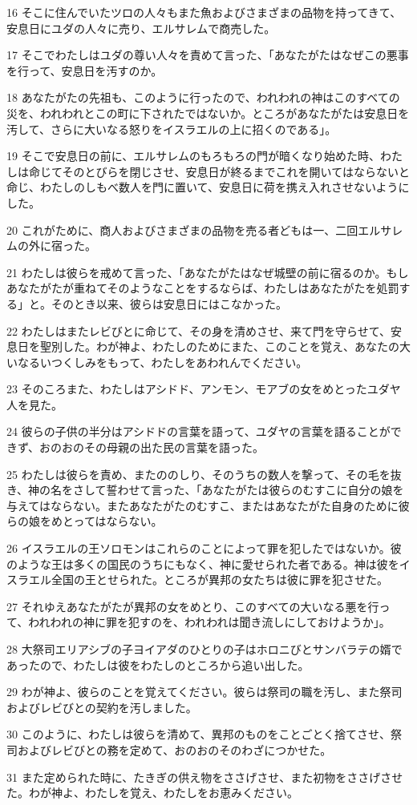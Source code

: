 \par 16 そこに住んでいたツロの人々もまた魚およびさまざまの品物を持ってきて、安息日にユダの人々に売り、エルサレムで商売した。
\par 17 そこでわたしはユダの尊い人々を責めて言った、「あなたがたはなぜこの悪事を行って、安息日を汚すのか。
\par 18 あなたがたの先祖も、このように行ったので、われわれの神はこのすべての災を、われわれとこの町に下されたではないか。ところがあなたがたは安息日を汚して、さらに大いなる怒りをイスラエルの上に招くのである」。
\par 19 そこで安息日の前に、エルサレムのもろもろの門が暗くなり始めた時、わたしは命じてそのとびらを閉じさせ、安息日が終るまでこれを開いてはならないと命じ、わたしのしもべ数人を門に置いて、安息日に荷を携え入れさせないようにした。
\par 20 これがために、商人およびさまざまの品物を売る者どもは一、二回エルサレムの外に宿った。
\par 21 わたしは彼らを戒めて言った、「あなたがたはなぜ城壁の前に宿るのか。もしあなたがたが重ねてそのようなことをするならば、わたしはあなたがたを処罰する」と。そのとき以来、彼らは安息日にはこなかった。
\par 22 わたしはまたレビびとに命じて、その身を清めさせ、来て門を守らせて、安息日を聖別した。わが神よ、わたしのためにまた、このことを覚え、あなたの大いなるいつくしみをもって、わたしをあわれんでください。
\par 23 そのころまた、わたしはアシドド、アンモン、モアブの女をめとったユダヤ人を見た。
\par 24 彼らの子供の半分はアシドドの言葉を語って、ユダヤの言葉を語ることができず、おのおのその母親の出た民の言葉を語った。
\par 25 わたしは彼らを責め、またののしり、そのうちの数人を撃って、その毛を抜き、神の名をさして誓わせて言った、「あなたがたは彼らのむすこに自分の娘を与えてはならない。またあなたがたのむすこ、またはあなたがた自身のために彼らの娘をめとってはならない。
\par 26 イスラエルの王ソロモンはこれらのことによって罪を犯したではないか。彼のような王は多くの国民のうちにもなく、神に愛せられた者である。神は彼をイスラエル全国の王とせられた。ところが異邦の女たちは彼に罪を犯させた。
\par 27 それゆえあなたがたが異邦の女をめとり、このすべての大いなる悪を行って、われわれの神に罪を犯すのを、われわれは聞き流しにしておけようか」。
\par 28 大祭司エリアシブの子ヨイアダのひとりの子はホロニびとサンバラテの婿であったので、わたしは彼をわたしのところから追い出した。
\par 29 わが神よ、彼らのことを覚えてください。彼らは祭司の職を汚し、また祭司およびレビびとの契約を汚しました。
\par 30 このように、わたしは彼らを清めて、異邦のものをことごとく捨てさせ、祭司およびレビびとの務を定めて、おのおのそのわざにつかせた。
\par 31 また定められた時に、たきぎの供え物をささげさせ、また初物をささげさせた。わが神よ、わたしを覚え、わたしをお恵みください。


